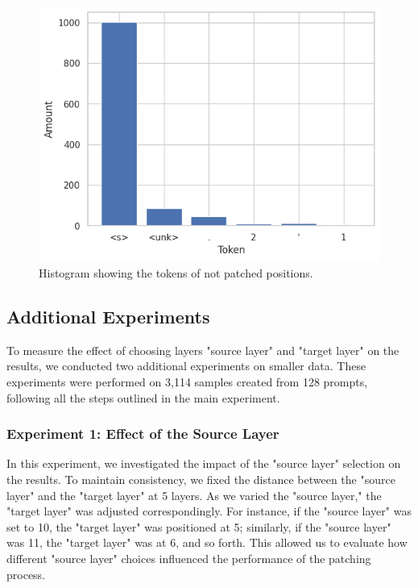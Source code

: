 \documentclass[11pt]{article}
\begin{document}
\begin{figure}[!ht]
    \centering
    \includegraphics[width=\columnwidth]{figures/Histogram showing the tokens of not patched position number.png}
    \caption{Histogram showing the tokens of not patched positions.}
    \vspace{-.5cm}
\end{figure}
\subsection{Additional Experiments}
To measure the effect of choosing layers "source layer" and "target layer" on the results, we conducted two additional experiments on smaller data.
These experiments were performed on 3,114 samples created from 128 prompts, following all the steps outlined in the main experiment.

\subsubsection*{Experiment 1: Effect of the Source Layer}
In this experiment, we investigated the impact of the "source layer" selection on the results. To maintain consistency, we fixed the distance between the "source layer" and the "target layer" at 5 layers. As we varied the "source layer," the "target layer" was adjusted correspondingly. For instance, if the "source layer" was set to 10, the "target layer" was positioned at 5; similarly, if the "source layer" was 11, the "target layer" was at 6, and so forth. This allowed us to evaluate how different "source layer" choices influenced the performance of the patching process.
\end{document}
